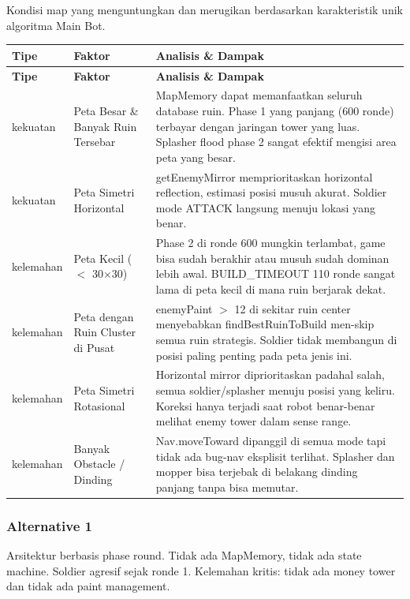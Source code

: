 \documentclass{article}
\begin{document}
\begin{enumerate}[label=\alph*.]

Kondisi map yang menguntungkan dan merugikan berdasarkan karakteristik unik algoritma Main Bot.

\begin{longtable}{|p{2cm}|p{3.5cm}|p{8.5cm}|}
\hline
\textbf{Tipe} & \textbf{Faktor} & \textbf{Analisis \& Dampak} \\
\hline
\endfirsthead
\hline
\textbf{Tipe} & \textbf{Faktor} & \textbf{Analisis \& Dampak} \\
\hline
\endhead
\hline
\endfoot
kekuatan
& Peta Besar \& Banyak Ruin Tersebar
& MapMemory dapat memanfaatkan seluruh database ruin.
Phase 1 yang panjang (600 ronde) terbayar dengan jaringan tower yang luas.
Splasher flood phase 2 sangat efektif mengisi area peta yang besar. \\
\hline
kekuatan
& Peta Simetri Horizontal
& getEnemyMirror memprioritaskan horizontal reflection, estimasi posisi musuh akurat.
Soldier mode ATTACK langsung menuju lokasi yang benar. \\
\hline
kelemahan
& Peta Kecil ($<$ 30$\times$30)
& Phase 2 di ronde 600 mungkin terlambat, game bisa sudah berakhir atau musuh sudah dominan lebih awal.
BUILD\_TIMEOUT 110 ronde sangat lama di peta kecil di mana ruin berjarak dekat. \\
\hline
kelemahan
& Peta dengan Ruin Cluster di Pusat
& enemyPaint $>$ 12 di sekitar ruin center menyebabkan findBestRuinToBuild men-skip semua ruin strategis.
Soldier tidak membangun di posisi paling penting pada peta jenis ini. \\
\hline
kelemahan
& Peta Simetri Rotasional
& Horizontal mirror diprioritaskan padahal salah, semua soldier/splasher menuju posisi yang keliru.
Koreksi hanya terjadi saat robot benar-benar melihat enemy tower dalam sense range. \\
\hline
kelemahan
& Banyak Obstacle / Dinding
& Nav.moveToward dipanggil di semua mode tapi tidak ada bug-nav eksplisit terlihat.
Splasher dan mopper bisa terjebak di belakang dinding panjang tanpa bisa memutar. \\
\hline
\end{longtable}

\subsubsection{Alternative 1}

Arsitektur berbasis phase round. Tidak ada MapMemory, tidak ada state machine. Soldier
agresif sejak ronde 1. Kelemahan kritis: tidak ada money tower dan tidak ada paint management.


\end{enumerate}
\end{document}
